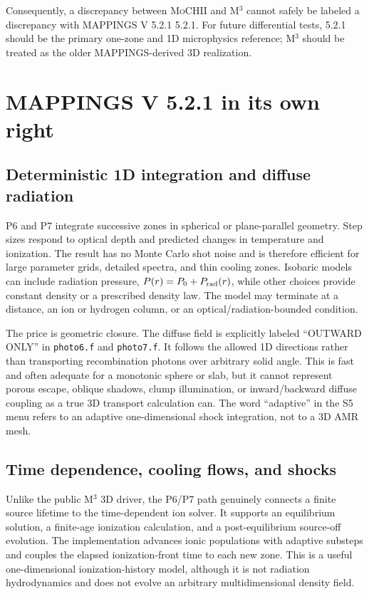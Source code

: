 \documentclass[english,a4paper]{my_memo}
\newcommand{\code}[1]{\texttt{#1}}
\newcommand{\MoCHII}{\textsc{MoCHII}}
\newcommand{\Mthree}{M$^3$}
\newcommand{\Mappings}{MAPPINGS V 5.2.1}
\begin{document}
Consequently, a discrepancy between \MoCHII{} and \Mthree{} cannot safely
be labeled a discrepancy with \Mappings{} 5.2.1.  For future differential
tests, 5.2.1 should be the primary one-zone and 1D microphysics reference;
\Mthree{} should be treated as the older MAPPINGS-derived 3D realization.

\section{MAPPINGS V 5.2.1 in its own right}

\subsection{Deterministic 1D integration and diffuse radiation}

P6 and P7 integrate successive zones in spherical or plane-parallel
geometry.  Step sizes respond to optical depth and predicted changes in
temperature and ionization.  The result has no Monte Carlo shot noise and
is therefore efficient for large parameter grids, detailed spectra, and
thin cooling zones.  Isobaric models can include radiation pressure,
$P(r)=P_0+P_{\rm rad}(r)$, while other choices provide constant density or
a prescribed density law.  The model may terminate at a distance, an ion
or hydrogen column, or an optical/radiation-bounded condition.

The price is geometric closure.  The diffuse field is explicitly labeled
``OUTWARD ONLY'' in \code{photo6.f} and \code{photo7.f}.  It follows the
allowed 1D directions rather than transporting recombination photons over
arbitrary solid angle.  This is fast and often adequate for a monotonic
sphere or slab, but it cannot represent porous escape, oblique shadows,
clump illumination, or inward/backward diffuse coupling as a true 3D
transport calculation can.  The word ``adaptive'' in the S5 menu refers
to an adaptive one-dimensional shock integration, not to a 3D AMR mesh.

\subsection{Time dependence, cooling flows, and shocks}
\label{sec:mapstrength}

Unlike the public \Mthree{} 3D driver, the P6/P7 path genuinely connects a
finite source lifetime to the time-dependent ion solver.  It supports an
equilibrium solution, a finite-age ionization calculation, and a
post-equilibrium source-off evolution.  The implementation advances ionic
populations with adaptive substeps and couples the elapsed ionization-front
time to each new zone.  This is a useful one-dimensional ionization-history
model, although it is not radiation hydrodynamics and does not evolve an
arbitrary multidimensional density field.
\end{document}
